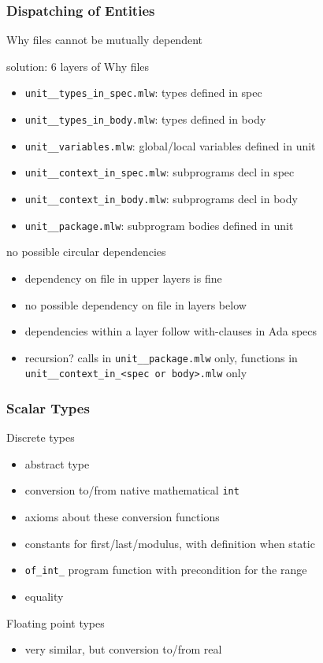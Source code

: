 \documentclass{beamer}
\newcommand{\vs}{\vspace{0.5cm}}
\newenvironment{specialframe}{%
  \begin{frame}[fragile,environment=specialframe]}{\end{frame}}
\begin{document}
\begin{specialframe}\frametitle{Dispatching of Entities}

Why files cannot be mutually dependent

\vs

solution: 6 layers of Why files
      \begin{itemize}
         \item \verb|unit__types_in_spec.mlw|: types defined in spec
         \item \verb|unit__types_in_body.mlw|: types defined in body
         \item \verb|unit__variables.mlw|: global/local variables defined in unit
         \item \verb|unit__context_in_spec.mlw|: subprograms decl in spec
         \item \verb|unit__context_in_body.mlw|: subprograms decl in body
         \item \verb|unit__package.mlw|: subprogram bodies defined in unit
      \end{itemize}

\vs

no possible circular dependencies
      \begin{itemize}
         \item dependency on file in upper layers is fine
         \item no possible dependency on file in layers below
         \item dependencies within a layer follow with-clauses in Ada specs
         \item recursion? calls in \verb|unit__package.mlw| only, functions in
           \verb|unit__context_in_<spec or body>.mlw| only
      \end{itemize}
\end{specialframe}

\begin{specialframe}\frametitle{Scalar Types}

   \begin{block}{Discrete types}
   \begin{itemize}
      \item abstract type
      \item conversion to/from native mathematical \verb|int|
      \item axioms about these conversion functions
      \item constants for first/last/modulus, with definition when static
      \item \verb|of_int_| program function with precondition for the range
      \item equality
   \end{itemize}
   \end{block}

   \begin{block}{Floating point types}
      \begin{itemize}
         \item very similar, but conversion to/from real
      \end{itemize}
   \end{block}
\end{specialframe}
\end{document}
